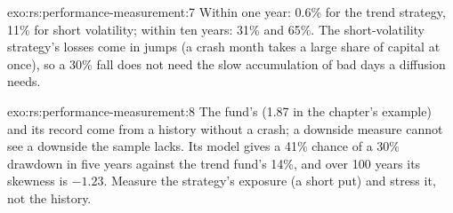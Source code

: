 \begin{solution}{exo:rs:performance-measurement:7}
Within one year: 0.6\% for the trend strategy, 11\% for short volatility; within ten years: 31\% and 65\%. The short-volatility strategy's losses come in jumps
(a crash month takes a large share of capital at once), so a 30\% fall does not need the slow accumulation of bad days a diffusion needs.
\end{solution}

\begin{solution}{exo:rs:performance-measurement:8}
The fund's  (1.87 in the chapter's example) and its record come from a history without a crash; a downside measure cannot see a downside the
sample lacks. Its model gives a 41\% chance of a 30\% drawdown in five years against the trend fund's 14\%, and over 100 years its skewness is $-1.23$.
Measure the strategy's exposure (a short put) and stress it, not the history.
\end{solution}

